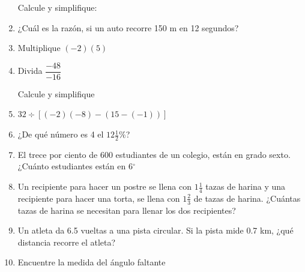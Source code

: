 \documentclass[twoside,letterpaper]{article}
\begin{document}
\begin{multicols}{2}
\begin{enumerate}
Calcule y simplifique:
\item ¿Cuál es la razón, si un auto recorre 150 m en 12 segundos?
\item Multiplique $(-2)(5)$
\item Divida $\dfrac{-48}{-16}$

Calcule y simplifique
\item $32\div [(-2)(-8)-(15-(-1))]$
\item ¿De qué número es 4 el $12\frac{1}{2}$\%?
\item El trece por ciento de 600 estudiantes de un colegio, están en grado sexto. ¿Cuánto estudiantes están en 6$^{\circ}$
\item Un recipiente para hacer un postre se llena con $1\frac{1}{4}$ tazas de harina y una recipiente para hacer una torta, se llena con $1\frac{2}{3}$ de tazas de harina. ¿Cuántas tazas de harina se necesitan para llenar los dos recipientes?
\item Un atleta da 6.5 vueltas a una pista circular. Si la pista mide 0.7 km, ¿qué distancia recorre el atleta?
\item Encuentre la medida del ángulo faltante
\begin{center}
\end{center}

\end{enumerate}
\end{multicols}
\end{document}
